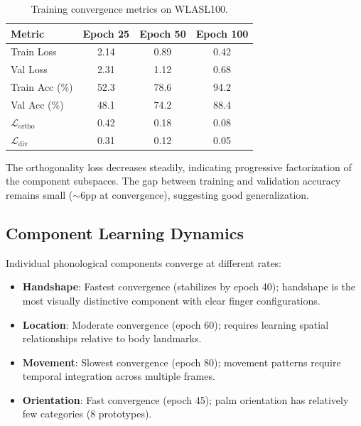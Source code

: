 \documentclass{article}
\begin{document}
\begin{table}[ht]
\caption{Training convergence metrics on WLASL100.}
\label{tab:convergence}
\vspace{-1mm}
\begin{center}
\begin{small}
\begin{tabular*}{\columnwidth}{@{\extracolsep{\fill}}lccc@{}}
\toprule
Metric & Epoch 25 & Epoch 50 & Epoch 100 \\
\midrule
Train Loss & 2.14 & 0.89 & 0.42 \\
Val Loss & 2.31 & 1.12 & 0.68 \\
Train Acc (\%) & 52.3 & 78.6 & 94.2 \\
Val Acc (\%) & 48.1 & 74.2 & 88.4 \\
$\mathcal{L}_{\text{ortho}}$ & 0.42 & 0.18 & 0.08 \\
$\mathcal{L}_{\text{div}}$ & 0.31 & 0.12 & 0.05 \\
\bottomrule
\end{tabular*}
\end{small}
\end{center}
\vspace{-2mm}
\end{table}

The orthogonality loss decreases steadily, indicating progressive factorization of the component subspaces. The gap between training and validation accuracy remains small ($\sim$6pp at convergence), suggesting good generalization.

\subsection{Component Learning Dynamics}

Individual phonological components converge at different rates:

\begin{itemize}[nosep,topsep=3pt,leftmargin=*]
\item \textbf{Handshape}: Fastest convergence (stabilizes by epoch 40); handshape is the most visually distinctive component with clear finger configurations.
\item \textbf{Location}: Moderate convergence (epoch 60); requires learning spatial relationships relative to body landmarks.
\item \textbf{Movement}: Slowest convergence (epoch 80); movement patterns require temporal integration across multiple frames.
\item \textbf{Orientation}: Fast convergence (epoch 45); palm orientation has relatively few categories (8 prototypes).
\end{itemize}
\end{document}
